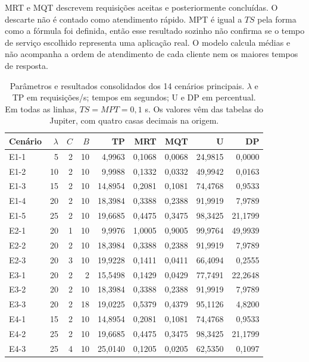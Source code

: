 \documentclass[10pt]{ieeeconf}
\begin{document}
MRT e MQT descrevem requisições aceitas e posteriormente concluídas. O descarte não é contado como atendimento rápido. MPT é igual a $TS$ pela forma como a fórmula foi definida, então esse resultado sozinho não confirma se o tempo de serviço escolhido representa uma aplicação real. O modelo calcula médias e não acompanha a ordem de atendimento de cada cliente nem os maiores tempos de resposta.

\begin{table}[!t]
\centering
\caption{Parâmetros e resultados consolidados dos 14 cenários principais. $\lambda$ e TP em requisições/s; tempos em segundos; U e DP em percentual. Em todas as linhas, $TS=MPT=0{,}1$ s. Os valores vêm das tabelas do Jupiter, com quatro casas decimais na origem.}
\label{tab:consolidada}
\begin{tabular}{lrrrrrrrr}
\toprule
Cenário & $\lambda$ & $C$ & $B$ & TP & MRT & MQT & U & DP\\
\midrule
E1-1 & 5 & 2 & 10 & 4,9963 & 0,1068 & 0,0068 & 24,9815 & 0,0000\\
E1-2 & 10 & 2 & 10 & 9,9988 & 0,1332 & 0,0332 & 49,9942 & 0,0163\\
E1-3 & 15 & 2 & 10 & 14,8954 & 0,2081 & 0,1081 & 74,4768 & 0,9533\\
E1-4 & 20 & 2 & 10 & 18,3984 & 0,3388 & 0,2388 & 91,9919 & 7,9789\\
E1-5 & 25 & 2 & 10 & 19,6685 & 0,4475 & 0,3475 & 98,3425 & 21,1799\\
\midrule
E2-1 & 20 & 1 & 10 & 9,9976 & 1,0005 & 0,9005 & 99,9764 & 49,9939\\
E2-2 & 20 & 2 & 10 & 18,3984 & 0,3388 & 0,2388 & 91,9919 & 7,9789\\
E2-3 & 20 & 3 & 10 & 19,9228 & 0,1411 & 0,0411 & 66,4094 & 0,2555\\
\midrule
E3-1 & 20 & 2 & 2 & 15,5498 & 0,1429 & 0,0429 & 77,7491 & 22,2648\\
E3-2 & 20 & 2 & 10 & 18,3984 & 0,3388 & 0,2388 & 91,9919 & 7,9789\\
E3-3 & 20 & 2 & 18 & 19,0225 & 0,5379 & 0,4379 & 95,1126 & 4,8200\\
\midrule
E4-1 & 15 & 2 & 10 & 14,8954 & 0,2081 & 0,1081 & 74,4768 & 0,9533\\
E4-2 & 25 & 2 & 10 & 19,6685 & 0,4475 & 0,3475 & 98,3425 & 21,1799\\
E4-3 & 25 & 4 & 10 & 25,0140 & 0,1205 & 0,0205 & 62,5350 & 0,1097\\
\bottomrule
\end{tabular}
\end{table}
\end{document}
